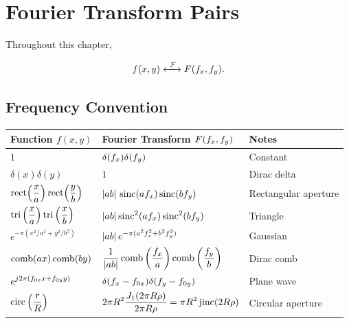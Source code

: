 %
%

\chapter{Fourier Transform Pairs}

Throughout this chapter,

\[
f(x,y)\xleftrightarrow{\ \FT\ }F(\fx,\fy).
\]

\section{Frequency Convention}

\begin{center}
\begin{tabular}{lll}
\toprule
Function $f(x,y)$ & Fourier Transform $F(f_x,f_y)$ & Notes\\
\midrule

$\displaystyle
1
$
&
$\displaystyle
\delta(f_x)\delta(f_y)
$
&
Constant

\\[0.5cm]

$\displaystyle
\delta(x)\delta(y)
$
&
$\displaystyle
1
$
&
Dirac delta

\\[0.5cm]

$\displaystyle
\operatorname{rect}\!\left(\frac{x}{a}\right)
\operatorname{rect}\!\left(\frac{y}{b}\right)
$
&
$\displaystyle
|ab|\,
\operatorname{sinc}(af_x)\operatorname{sinc}(bf_y)
$
&
Rectangular aperture

\\[0.5cm]

$\displaystyle
\operatorname{tri}\left(\frac{x}{a}\right)\operatorname{tri}\left(\frac{x}{b}\right)
$
&
$\displaystyle
|ab|\operatorname{sinc}^2(af_x)\operatorname{sinc}^2(bf_y)
$
&
Triangle

\\[0.5cm]

$\displaystyle
e^{-\pi(x^2/a^2+y^2/b^2)}
$
&
$\displaystyle
|ab|\,
e^{-\pi(a^2f_x^2+b^2f_y^2)}
$
&
Gaussian
\\[0.5cm]

$\displaystyle
\operatorname{comb}(ax)\operatorname{comb}(by)
$
&
$\displaystyle
\frac{1}{|ab|}\operatorname{comb}\left(\frac{f_x}{a}\right)\operatorname{comb}\left(\frac{f_y}{b}\right)
$
&
Dirac comb

\\[0.5cm]

$\displaystyle
e^{j 2\pi(f_{0x}x+f_{0y}y)}
$
&
$\displaystyle
\delta(f_x-f_{0x})
\delta(f_y-f_{0y})
$
&
Plane wave

\\[0.5cm]

$\displaystyle
\operatorname{circ}\left(\frac{r}{R}\right)
$
&
$\displaystyle
2\pi R^2\frac{J_1(2\pi R\rho)}{2 \pi R\rho}=\pi R^2\operatorname{jinc}(2R\rho)
$
&
Circular aperture

\\

\bottomrule
\end{tabular}
\end{center}

